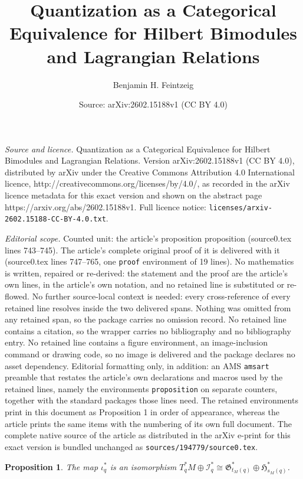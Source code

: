 \documentclass[10pt,a4paper]{amsart}
\title{Quantization as a Categorical Equivalence for Hilbert Bimodules and Lagrangian Relations}
\author{Benjamin H. Feintzeig}
\date{Source: arXiv:2602.15188v1 (CC BY 4.0)}
\newtheorem{proposition}{Proposition}
\begin{document}
\maketitle

\noindent\emph{Source and licence.} Quantization as a Categorical Equivalence for Hilbert Bimodules and Lagrangian Relations. Version arXiv:2602.15188v1 (CC BY 4.0), distributed by arXiv under the Creative Commons Attribution 4.0 International licence, http://creativecommons.org/licenses/by/4.0/, as recorded in the arXiv licence metadata for this exact version and shown on the abstract page https://arxiv.org/abs/2602.15188v1. Full licence notice: \texttt{licenses/arxiv-2602.15188-CC-BY-4.0.txt}.\par\smallskip

\noindent\textit{Editorial scope.} Counted unit: the article's proposition proposition (source0.tex lines 743--745). The article's complete original proof of it is delivered with it (source0.tex lines 747--765, one \texttt{proof} environment of 19 lines). No mathematics is written, repaired or re-derived: the statement and the proof are the article's own lines, in the article's own notation, and no retained line is substituted or re-flowed.  No further source-local context is needed: every cross-reference of every retained line resolves inside the two delivered spans.  Nothing was omitted from any retained span, so the package carries no omission record.  No retained line contains a citation, so the wrapper carries no bibliography and no bibliography entry.  No retained line contains a figure environment, an image-inclusion command or drawing code, so no image is delivered and the package declares no asset dependency.  Editorial formatting only, in addition: an AMS \texttt{amsart} preamble that restates the article's own declarations and macros used by the retained lines, namely the environments \texttt{proposition} on separate counters, together with the standard packages those lines need.  The retained environments print in this document as Proposition 1 in order of appearance, whereas the article prints the same items with the numbering of its own full document.  The complete native source of the article as distributed in the arXiv e-print for this exact version is bundled unchanged as \texttt{sources/194779/source0.tex}.
\begin{proposition}
    The map $\iota^*_q$ is an isomorphism $T^*_qM\oplus \mathcal{I}_q^*\cong\mathfrak{G}^*_{t_M(q)}\oplus\mathfrak{H}^*_{s_M(q)}$.
\end{proposition}
\end{document}
